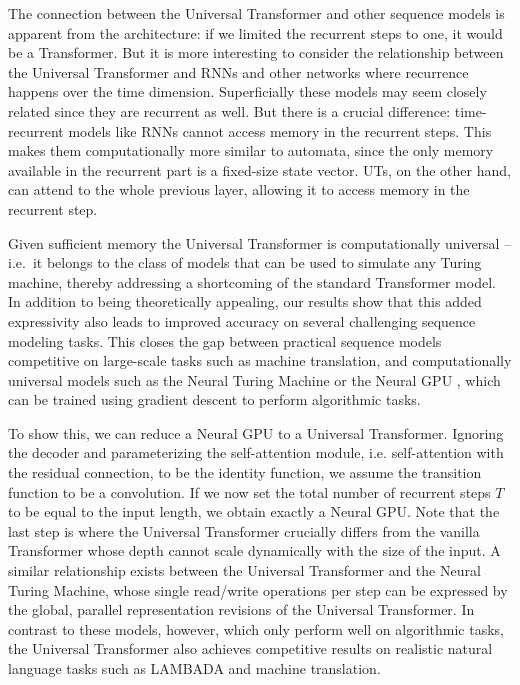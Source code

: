 The connection between the Universal Transformer and other sequence models is apparent from the architecture: if we limited the recurrent steps to one, it would be a Transformer. But it is more interesting to consider the relationship between the Universal Transformer and RNNs and other networks where recurrence happens over the time dimension. Superficially these models may seem closely related since they are recurrent as well. But there is a crucial difference: time-recurrent models like RNNs cannot access memory in the recurrent steps. This makes them computationally more similar to automata, since the only memory available in the recurrent part is a fixed-size state vector. UTs, on the other hand, can attend to the whole previous layer, allowing it to access memory in the recurrent step. 

Given sufficient memory the Universal Transformer is computationally universal -- i.e.\ it belongs to the class of models that can be used to simulate any Turing machine, thereby addressing a shortcoming of the standard Transformer model. In addition to being theoretically appealing, our results show that this added expressivity also leads to improved accuracy on several challenging sequence modeling tasks. This closes the gap between practical sequence models competitive on large-scale tasks such as machine translation, and computationally universal models such as the Neural Turing Machine or the Neural GPU \citep{ntm14,neural_gpu}, which can be trained using gradient descent to perform algorithmic tasks.

To show this, we can reduce a Neural GPU to a Universal Transformer. Ignoring the decoder and parameterizing the self-attention module, i.e. self-attention with the residual connection, to be the identity function, we assume the transition function to be a convolution. If we now set the total number of recurrent steps $T$ to be equal to the input length, we obtain exactly a Neural GPU. Note that the last step is where the Universal Transformer crucially differs from the vanilla Transformer whose depth cannot scale dynamically with the size of the input. A similar relationship exists between the Universal Transformer and the Neural Turing Machine, whose single read/write operations per step can be expressed by the global, parallel representation revisions of the Universal Transformer. In contrast to these models, however, which only perform well on algorithmic tasks, the Universal Transformer also achieves competitive results on realistic natural language tasks such as LAMBADA and machine translation.

